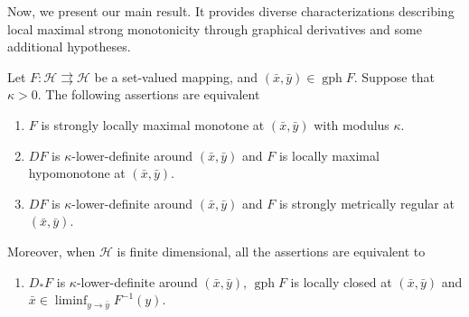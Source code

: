 \documentclass[smallextended,envcountsect,envcountsame]{svjour3}
\renewcommand{\H}{\mathcal{H}}
\newcommand{\tto}{\rightrightarrows}
\newcommand{\gph}{\operatorname{gph}}
\newcommand{\1}{\mathds{1}}
\begin{document}
        Now, we present our main result. It provides diverse characterizations describing local maximal strong monotonicity through graphical derivatives and some additional hypotheses. 
	\begin{theorem}\label{prop-s-m-r}
		Let $F\colon \H\tto\H$ be a set-valued mapping, and $(\bar x,\bar y)\in \gph F$. Suppose that $\kappa>0$. The following assertions are equivalent
		\begin{enumerate}
			\item [(a)] $F$ is strongly locally maximal monotone at $(\bar x,\bar y)$ with modulus $\kappa$.
			\item [(b)] $DF$ is $\kappa$-lower-definite around $(\bar x,\bar y)$ and $F$ is locally maximal hypomonotone at $(\bar x,\bar y)$.
			\item [(c)] $DF$ is $\kappa$-lower-definite around $(\bar x,\bar y)$ and $F$ is strongly metrically regular at $(\bar x,\bar y)$.
		\end{enumerate}
		Moreover, when $\H$ is finite dimensional, all the assertions are equivalent to
		\begin{enumerate}
			\item [(d)] $D_\ast F$ is $\kappa$-lower-definite around $(\bar x,\bar y)$, $\gph F$ is locally closed at $(\bar x,\bar y)$ and $\bar x\in \liminf_{y\to\bar y}F^{-1}(y)$.
		\end{enumerate}
	\end{theorem}
\end{document}
